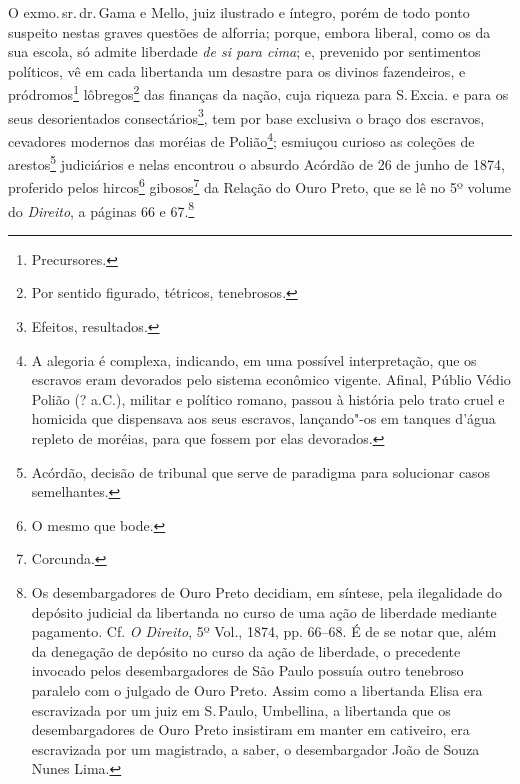 O exmo.\,sr.\,dr.\,Gama e Mello, juiz ilustrado e íntegro, porém de todo
ponto suspeito nestas graves questões de alforria; porque, embora
liberal, como os da sua escola, só admite liberdade \emph{de si para
cima}; e, prevenido por sentimentos políticos, vê em cada libertanda um
desastre para os divinos fazendeiros, e pródromos\footnote{
  Precursores.} lôbregos\footnote{Por sentido figurado, tétricos,
  tenebrosos.} das finanças da nação, cuja riqueza para S.\,Excia. e para
os seus desorientados consectários\footnote{Efeitos, resultados.}, tem
por base exclusiva o braço dos escravos, cevadores modernos das moréias
de Polião\footnote{A alegoria é complexa, indicando, em uma possível
  interpretação, que os escravos eram devorados pelo sistema econômico vigente.
  Afinal, Públio Védio Polião (? a.C.), militar e político romano,
  passou à história pelo trato cruel e homicida que dispensava aos seus
  escravos, lançando"-os em tanques d'água repleto de moréias, para que
  fossem por elas devorados.}; esmiuçou curioso as coleções de
arestos\footnote{Acórdão, decisão de tribunal que serve de paradigma
  para solucionar casos semelhantes.} judiciários e nelas encontrou o
absurdo Acórdão de 26 de junho de 1874, proferido pelos hircos\footnote{
  O mesmo que bode.} gibosos\footnote{Corcunda.} da Relação do Ouro
Preto, que se lê no 5º volume do \emph{Direito}, a páginas 66 e
67.\footnote{Os desembargadores de Ouro Preto decidiam, em síntese,
  pela ilegalidade do depósito judicial da libertanda no curso de uma
  ação de liberdade mediante pagamento. Cf. \emph{O Direito}, 5º Vol.,
  1874, pp. 66--68. É de se notar que, além da denegação de depósito no
  curso da ação de liberdade, o precedente invocado pelos
  desembargadores de São Paulo possuía outro tenebroso paralelo com o
  julgado de Ouro Preto. Assim como a libertanda Elisa era escravizada
  por um juiz em S.\,Paulo, Umbellina, a libertanda que os
  desembargadores de Ouro Preto insistiram em manter em cativeiro, era
  escravizada por um magistrado, a saber, o desembargador João de Souza
  Nunes Lima.}

